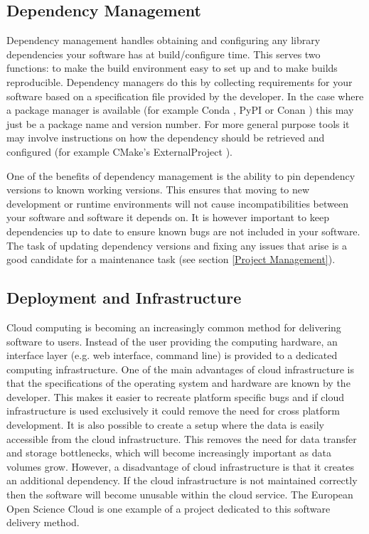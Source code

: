 \documentclass[jnr]{iosart2x}
\begin{document}
\subsection{Dependency Management}
\label{Dependency Management}

Dependency management handles obtaining and configuring any library dependencies your software has at build/configure time.
This serves two functions: to make the build environment easy to set up and to make builds reproducible.
Dependency managers do this by collecting requirements for your software based on a specification file provided by the developer.
In the case where a package manager is available (for example Conda \cite{Conda}, PyPI \cite{PyPI} or Conan \cite{Conan}) this may just be a package name and version number.
For more general purpose tools it may involve instructions on how the dependency should be retrieved and configured (for example CMake's ExternalProject \cite{CMake_ExternalProject}).

One of the benefits of dependency management is the ability to pin dependency versions to known working versions.
This ensures that moving to new development or runtime environments will not cause incompatibilities between your software and software it depends on.
It is however important to keep dependencies up to date to ensure known bugs are not included in your software.
The task of updating dependency versions and fixing any issues that arise is a good candidate for a maintenance task (see section \ref{Project Management}).

\subsection{Deployment and Infrastructure}
\label{Infrastructure}

Cloud computing is becoming an increasingly common method for delivering software to users.
Instead of the user providing the computing hardware, an interface layer (e.g. web interface, command line) is provided to a dedicated computing infrastructure.
One of the main advantages of cloud infrastructure is that the specifications of the operating system and hardware are known by the developer.
This makes it easier to recreate platform specific bugs and if cloud infrastructure is used exclusively it could remove the need for cross platform development.
It is also possible to create a setup where the data is easily accessible from the cloud infrastructure.
This removes the need for data transfer and storage bottlenecks, which will become increasingly important as data volumes grow.
However, a disadvantage of cloud infrastructure is that it creates an additional dependency.
If the cloud infrastructure is not maintained correctly then the software will become unusable within the cloud service.
The European Open Science Cloud \cite{EOSC} is one example of a project dedicated to this software delivery method.
\end{document}
